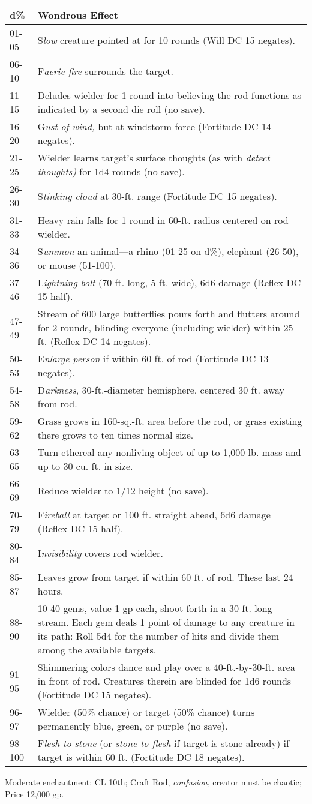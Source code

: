\documentclass{article}
\begin{document}
\begin{tabular}{|>{\raggedright}p{24pt}|>{\raggedright}p{302pt}|}
\hline
d\textbf{\%} & W\textbf{ondrous Effect}\tabularnewline
\hline
01-05 & S\textit{low }creature pointed at for 10 rounds (Will DC 15 negates).\tabularnewline
\hline
06-10 & F\textit{aerie fire }surrounds the target.\tabularnewline
\hline
11-15 & Deludes wielder for 1 round into believing the rod functions as indicated 
by a second die roll (no save).\tabularnewline
\hline
16-20 & G\textit{ust of wind, }but at windstorm force (Fortitude DC 14 negates).\tabularnewline
\hline
21-25 & Wielder learns target's surface thoughts (as with \textit{detect thoughts) 
}for 1d4 rounds (no save).\tabularnewline
\hline
26-30 & S\textit{tinking cloud }at 30-ft. range (Fortitude DC 15 negates).\tabularnewline
\hline
31-33 & Heavy rain falls for 1 round in 60-ft. radius centered on rod wielder.\tabularnewline
\hline
34-36 & S\textit{ummon }an animal---a rhino (01-25 on d\%), elephant (26-50), or 
mouse (51-100).\tabularnewline
\hline
37-46 & L\textit{ightning bolt }(70 ft. long, 5 ft. wide), 6d6 damage (Reflex DC 
15 half).\tabularnewline
\hline
47-49 & Stream of 600 large butterflies pours forth and flutters around for 2 rounds, 
blinding everyone (including wielder) within 25 ft. (Reflex DC 14 negates).\tabularnewline
\hline
50-53 & E\textit{nlarge person }if within 60 ft. of rod (Fortitude DC 13 negates).\tabularnewline
\hline
54-58 & D\textit{arkness}, 30-ft.-diameter hemisphere, centered 30 ft. away from 
rod.\tabularnewline
\hline
59-62 & Grass grows in 160-sq.-ft. area before the rod, or grass existing there 
grows to ten times normal size.\tabularnewline
\hline
63-65 & Turn ethereal any nonliving object of up to 1,000 lb. mass and up to 30 
cu. ft. in size.\tabularnewline
\hline
66-69 & Reduce wielder to 1/12 height (no save).\tabularnewline
\hline
70-79 & F\textit{ireball }at target or 100 ft. straight ahead, 6d6 damage (Reflex 
DC 15 half).\tabularnewline
\hline
80-84 & I\textit{nvisibility }covers rod wielder.\tabularnewline
\hline
85-87 & Leaves grow from target if within 60 ft. of rod. These last 24 hours.\tabularnewline
\hline
88-90 & 10-40 gems, value 1 gp each, shoot forth in a 30-ft.-long stream. Each 
gem deals 1 point of damage to any creature in its path: Roll 5d4 for the number 
of hits and divide them among the available targets.\tabularnewline
\hline
91-95 & Shimmering colors dance and play over a 40-ft.-by-30-ft. area in front 
of rod. Creatures therein are blinded for 1d6 rounds (Fortitude DC 15 negates).\tabularnewline
\hline
96-97 & Wielder (50\% chance) or target (50\% chance) turns permanently blue, green, 
or purple (no save).\tabularnewline
\hline
98-100 & F\textit{lesh to stone }(or \textit{stone to flesh }if target is stone 
already) if target is within 60 ft. (Fortitude DC 18 negates).\tabularnewline
\hline
\end{tabular}

Moderate enchantment; CL 10th; Craft Rod, \textit{confusion}, creator must be chaotic; 
Price 12,000 gp.

\newpage
\end{document}
